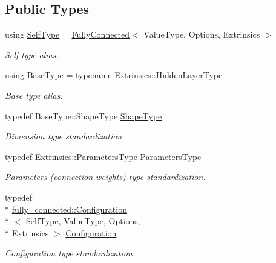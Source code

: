 \subsection*{Public Types}
\begin{DoxyCompactItemize}
\item 
using \hyperlink{classffnn_1_1layer_1_1_fully_connected_a886c7ef9b12d8835f0acb231f446e8cf}{Self\-Type} = \hyperlink{classffnn_1_1layer_1_1_fully_connected}{Fully\-Connected}$<$ Value\-Type, Options, Extrinsics $>$
\begin{DoxyCompactList}\small\item\em Self type alias. \end{DoxyCompactList}\item 
using \hyperlink{classffnn_1_1layer_1_1_fully_connected_afd4e92710e0f74a32ea0ca1a44925b48}{Base\-Type} = typename Extrinsics\-::\-Hidden\-Layer\-Type
\begin{DoxyCompactList}\small\item\em Base type alias. \end{DoxyCompactList}\item 
typedef Base\-Type\-::\-Shape\-Type \hyperlink{classffnn_1_1layer_1_1_fully_connected_a9599c763b107d8b07bba62a74c88e907}{Shape\-Type}
\begin{DoxyCompactList}\small\item\em Dimension type standardization. \end{DoxyCompactList}\item 
typedef Extrinsics\-::\-Parameters\-Type \hyperlink{classffnn_1_1layer_1_1_fully_connected_aab9cb25e10620b406a13414ac81747fa}{Parameters\-Type}
\begin{DoxyCompactList}\small\item\em Parameters (connection weights) type standardization. \end{DoxyCompactList}\item 
typedef \\*
\hyperlink{classffnn_1_1layer_1_1fully__connected_1_1_configuration}{fully\-\_\-connected\-::\-Configuration}\\*
$<$ \hyperlink{classffnn_1_1layer_1_1_fully_connected_a886c7ef9b12d8835f0acb231f446e8cf}{Self\-Type}, Value\-Type, Options, \\*
Extrinsics $>$ \hyperlink{classffnn_1_1layer_1_1_fully_connected_a0f17b9785828b21e00a8fe84fd173406}{Configuration}
\begin{DoxyCompactList}\small\item\em Configuration type standardization. \end{DoxyCompactList}\end{DoxyCompactItemize}
